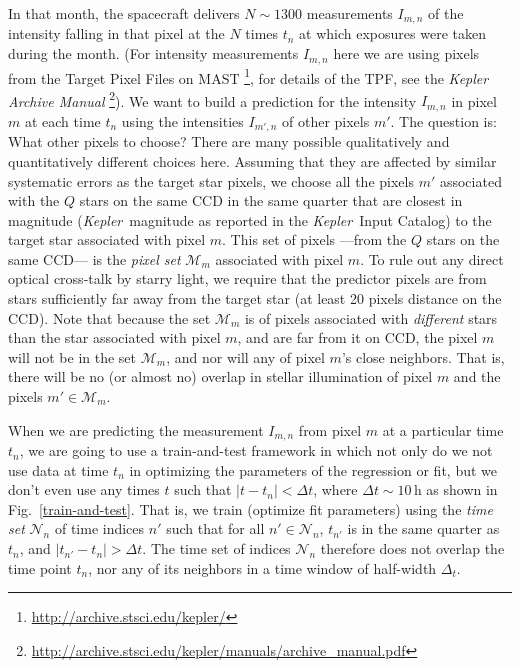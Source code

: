 \documentclass[12pt, preprint]{aastex}
\newcommand{\project}[1]{\textsl{#1}}
\newcommand{\Kepler}{\project{Kepler}}
\newcommand{\set}[1]{\mathcal{#1}}
\begin{document}
In that month, the spacecraft delivers $N\sim 1300$ measurements $I_{m,n}$
  of the intensity falling in that pixel at the $N$ times $t_n$ at which exposures were taken during the month.
(For intensity measurements $I_{m,n}$ here we are using pixels from the Target Pixel Files on MAST
  \footnote{\url{http://archive.stsci.edu/kepler/}}, for details of the TPF, 
  see the \project{Kepler Archive Manual} 
  \footnote{\url{http://archive.stsci.edu/kepler/manuals/archive_manual.pdf}}).
We want to build a prediction for the intensity $I_{m,n}$ in pixel $m$ at each time $t_n$
  using the intensities $I_{m',n}$ of other pixels $m'$.
The question is:  What other pixels to choose?
There are many possible qualitatively and quantitatively different choices here.
Assuming that they are affected by similar systematic errors as the target star pixels, we choose all the pixels $m'$ associated with the $Q$ stars on the same CCD in the same quarter
  that are closest in magnitude
  (\Kepler\ magnitude as reported in the \Kepler\ Input Catalog)
  to the target star associated with pixel $m$.
This set of pixels%
  ---from the $Q$ stars on the same CCD---%
  is the \emph{pixel set} $\set{M}_m$ associated with pixel $m$.
   To rule out any direct optical cross-talk by starry 
light, we require that the predictor pixels are from stars
sufficiently far away from the target star (at least 20 pixels distance on the CCD).
Note that because the set $\set{M}_m$ is of pixels associated with \emph{different} stars
  than the star associated with pixel $m$, and are far from it on CCD, 
  the pixel $m$ will not be in the set $\set{M}_m$,
  and nor will any of pixel $m$'s close neighbors.
That is, there will be no (or almost no) overlap in stellar illumination of pixel $m$
  and the pixels $m'\in\set{M}_m$.

When we are predicting the measurement $I_{m,n}$ from pixel $m$ at a particular time $t_n$,
  we are going to use a train-and-test framework in which not only do we not use
  data at time $t_n$ in optimizing the parameters of the regression or fit,
  but we don't even use any times $t$ such that $|t-t_n| < \Delta t$,
  where $\Delta t\sim 10$\,h as shown in Fig.~\ref{train-and-test}.
That is, we train (optimize fit parameters) using the \emph{time set} $\set{N}_n$ of time
  indices $n'$ such that for all $n'\in\set{N}_n$,
  $t_{n'}$ is in the same quarter as $t_n$,
  and $|t_{n'} - t_n|>\Delta t$.
The time set of indices $\set{N}_n$ therefore does not overlap the time point $t_n$,
  nor any of its neighbors in a time window of half-width $\Delta_t$. 
  
\end{document}
